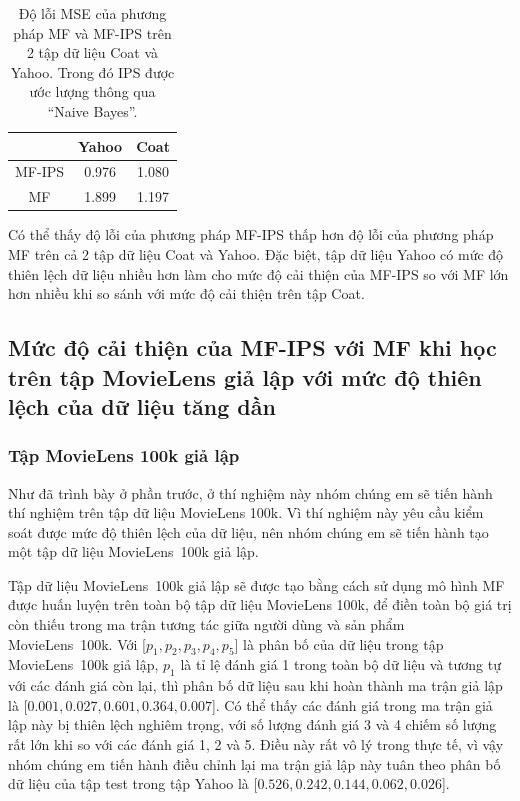 \begin{table}[h]
    \centering
    \begin{tabular}{ccc}
    \hline
     & Yahoo & Coat \\ \hline
    MF-IPS & 0.976 & 1.080 \\
    MF & 1.899 & 1.197
    \end{tabular}
    \caption{Độ lỗi MSE của phương pháp MF và MF-IPS trên 2 tập dữ liệu Coat và Yahoo. Trong đó IPS được ước lượng thông qua ``Naive Bayes''.}
    \label{table:yahoo_coat_NB}
\end{table}

Có thể thấy độ lỗi của phương pháp MF-IPS thấp hơn độ lỗi của phương pháp MF trên cả 2 tập dữ liệu Coat và Yahoo. Đặc biệt, tập dữ liệu Yahoo có mức độ thiên lệch dữ liệu nhiều hơn làm cho mức độ cải thiện của MF-IPS so với MF lớn hơn nhiều khi so sánh với mức độ cải thiện trên tập Coat.

\subsection{Mức độ cải thiện của MF-IPS với MF khi học trên tập MovieLens giả lập với mức độ thiên lệch của dữ liệu tăng dần}
\subsubsection{Tập MovieLens 100k giả lập}
\label{subsubsection:MovieLens}
Như đã trình bày ở phần trước, ở thí nghiệm này nhóm chúng em sẽ tiến hành thí nghiệm trên tập dữ liệu MovieLens 100k. Vì thí nghiệm này yêu cầu kiểm soát được mức độ thiên lệch của dữ liệu, nên nhóm chúng em sẽ tiến hành tạo một tập dữ liệu MovieLens~100k giả lập. 

Tập dữ liệu MovieLens~100k giả lập sẽ được tạo bằng cách sử dụng mô hình MF được huấn luyện trên toàn bộ tập dữ liệu MovieLens 100k, để điền toàn bộ giá trị còn thiếu trong ma trận tương tác giữa người dùng và sản phẩm MovieLens~100k. Với [$p_1, p_2, p_3, p_4, p_5$] là phân bố của dữ liệu trong tập MovieLens~100k giả lập, $p_1$ là tỉ lệ đánh giá 1 trong toàn bộ dữ liệu và tương tự với các đánh giá còn lại, thì phân bố dữ liệu sau khi hoàn thành ma trận giả lập là [$0.001, 0.027, 0.601, 0.364, 0.007$]. Có thể thấy các đánh giá trong ma trận giả lập này bị thiên lệch nghiêm trọng, với số lượng đánh giá 3 và 4 chiếm số lượng rất lớn khi so với các đánh giá 1, 2 và 5. Điều này rất vô lý trong thực tế, vì vậy nhóm chúng em tiến hành điều chỉnh lại ma trận giả lập này tuân theo phân bố dữ liệu của tập test trong tập Yahoo là [$0.526, 0.242, 0.144, 0.062, 0.026$].

